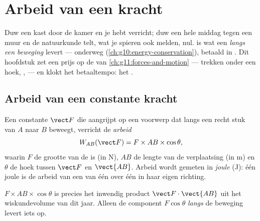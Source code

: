 \chapter{Arbeid van een kracht}\label{ch:g11:work-of-force}

Duw een kast door de kamer en je hebt  verricht; duw een hele
middag tegen een muur en de natuurkunde telt, wat je spieren ook
melden, nul.  is wat een  \emph{langs een beweging} levert
---  onderweg (\cref{ch:g10:energy-conservation}), betaald in
. Dit hoofdstuk zet een prijs op de  van
\cref{ch:g11:forces-and-motion} --- trekken onder een hoek, ,
 --- en klokt het betaaltempo: het .

\section{Arbeid van een constante kracht}

\begin{definition}\label{def:g11:work-of-force:work}
Een constante  $\vect F$ die aangrijpt op een voorwerp dat langs
een recht stuk van $A$ naar $B$ beweegt, verricht de
\emph{arbeid}
\[
W_{AB}(\vect F) = F \times AB \times \cos\theta ,
\]
waarin $F$ de grootte van de  is (in \unit{N}), $AB$ de lengte van
de verplaatsing (in \unit{m}) en $\theta$ de hoek tussen $\vect F$ en
$\vect{AB}$. Arbeid wordt gemeten in \emph{joule}
(\unit{J}): één joule is de arbeid van een  van één  over
één  in haar eigen richting.
\end{definition}

\begin{remark}\label{rem:g11:work-of-force:scal}
$F \times AB \times \cos\theta$ is precies het inwendig product
$\vect F \cdot \vect{AB}$ uit het wiskundevolume van dit jaar. Alleen de
component $F\cos\theta$ \emph{langs} de beweging levert iets op.
\end{remark}

